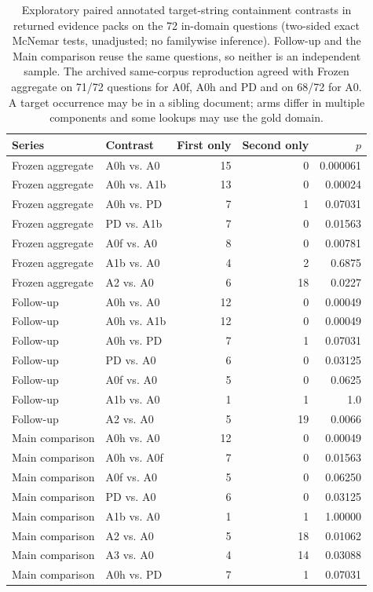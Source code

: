 \begin{table}[t]
\centering\small
\caption{Exploratory paired annotated target-string containment contrasts in
returned evidence packs on the 72 in-domain questions (two-sided exact
McNemar tests, unadjusted; no familywise inference). Follow-up and the Main
comparison reuse the same questions, so neither is an independent sample.
The archived same-corpus reproduction agreed with Frozen aggregate on
71/72 questions for A0f, A0h and PD and on 68/72 for A0. A target occurrence
may be in a sibling document; arms differ in multiple components and some
lookups may use the gold domain.}
\label{tab:s-paired-data}
\begin{tabular}{llrrr}
\toprule
Series & Contrast & First only & Second only & $p$ \\
\midrule
Frozen aggregate & A0h vs. A0 & 15 & 0 & 0.000061 \\
Frozen aggregate & A0h vs. A1b & 13 & 0 & 0.00024 \\
Frozen aggregate & A0h vs. PD & 7 & 1 & 0.07031 \\
Frozen aggregate & PD vs. A1b & 7 & 0 & 0.01563 \\
Frozen aggregate & A0f vs. A0 & 8 & 0 & 0.00781 \\
Frozen aggregate & A1b vs. A0 & 4 & 2 & 0.6875 \\
Frozen aggregate & A2 vs. A0 & 6 & 18 & 0.0227 \\
Follow-up & A0h vs. A0 & 12 & 0 & 0.00049 \\
Follow-up & A0h vs. A1b & 12 & 0 & 0.00049 \\
Follow-up & A0h vs. PD & 7 & 1 & 0.07031 \\
Follow-up & PD vs. A0 & 6 & 0 & 0.03125 \\
Follow-up & A0f vs. A0 & 5 & 0 & 0.0625 \\
Follow-up & A1b vs. A0 & 1 & 1 & 1.0 \\
Follow-up & A2 vs. A0 & 5 & 19 & 0.0066 \\
Main comparison & A0h vs. A0 & 12 & 0 & 0.00049 \\
Main comparison & A0h vs. A0f & 7 & 0 & 0.01563 \\
Main comparison & A0f vs. A0 & 5 & 0 & 0.06250 \\
Main comparison & PD vs. A0 & 6 & 0 & 0.03125 \\
Main comparison & A1b vs. A0 & 1 & 1 & 1.00000 \\
Main comparison & A2 vs. A0 & 5 & 18 & 0.01062 \\
Main comparison & A3 vs. A0 & 4 & 14 & 0.03088 \\
Main comparison & A0h vs. PD & 7 & 1 & 0.07031 \\
\bottomrule
\end{tabular}
\end{table}
